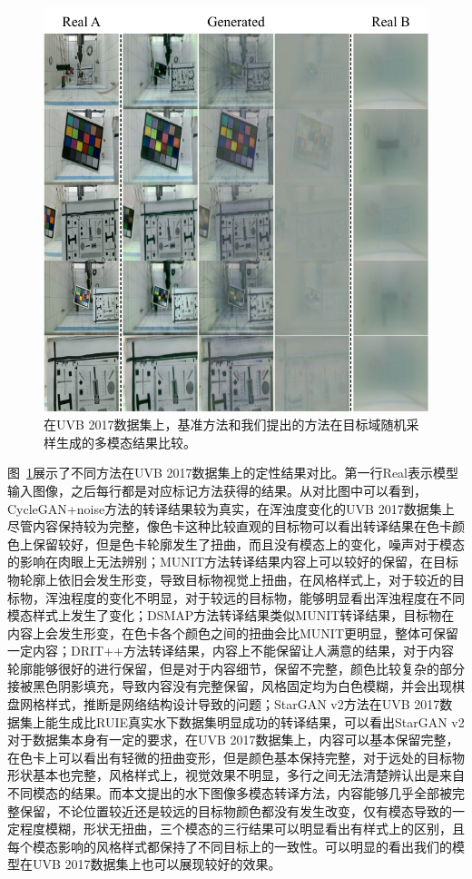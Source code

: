 \begin{figure}[htp]
    \centering
	\includegraphics[width=\textwidth]{figures/UVB_random.pdf}
	\caption{在UVB 2017数据集上，基准方法和我们提出的方法在目标域随机采样生成的多模态结果比较。}
	\label{fig:uvb_random}
\end{figure}

图~\ref{fig:uvb_random}展示了不同方法在UVB 2017数据集上的定性结果对比。第一行Real表示模型输入图像，之后每行都是对应标记方法获得的结果。从对比图中可以看到，CycleGAN+noise方法的转译结果较为真实，在浑浊度变化的UVB 2017数据集上尽管内容保持较为完整，像色卡这种比较直观的目标物可以看出转译结果在色卡颜色上保留较好，但是色卡轮廓发生了扭曲，而且没有模态上的变化，噪声对于模态的影响在肉眼上无法辨别；MUNIT方法转译结果内容上可以较好的保留，在目标物轮廓上依旧会发生形变，导致目标物视觉上扭曲，在风格样式上，对于较近的目标物，浑浊程度的变化不明显，对于较远的目标物，能够明显看出浑浊程度在不同模态样式上发生了变化；DSMAP方法转译结果类似MUNIT转译结果，目标物在内容上会发生形变，在色卡各个颜色之间的扭曲会比MUNIT更明显，整体可保留一定内容；DRIT++方法转译结果，内容上不能保留让人满意的结果，对于内容轮廓能够很好的进行保留，但是对于内容细节，保留不完整，颜色比较复杂的部分接被黑色阴影填充，导致内容没有完整保留，风格固定均为白色模糊，并会出现棋盘网格样式，推断是网络结构设计导致的问题；StarGAN v2方法在UVB 2017数据集上能生成比RUIE真实水下数据集明显成功的转译结果，可以看出StarGAN v2对于数据集本身有一定的要求，在UVB 2017数据集上，内容可以基本保留完整，在色卡上可以看出有轻微的扭曲变形，但是颜色基本保持完整，对于远处的目标物形状基本也完整，风格样式上，视觉效果不明显，多行之间无法清楚辨认出是来自不同模态的结果。而本文提出的水下图像多模态转译方法，内容能够几乎全部被完整保留，不论位置较近还是较远的目标物颜色都没有发生改变，仅有模态导致的一定程度模糊，形状无扭曲，三个模态的三行结果可以明显看出有样式上的区别，且每个模态影响的风格样式都保持了不同目标上的一致性。可以明显的看出我们的模型在UVB 2017数据集上也可以展现较好的效果。

